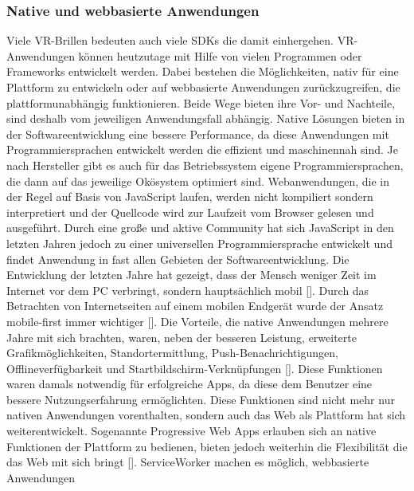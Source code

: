 \documentclass[a4paper,12pt,oneside]{article}
\begin{document}
      \subsubsection{Native und webbasierte Anwendungen}
        Viele VR-Brillen bedeuten auch viele SDKs die damit einhergehen. VR-Anwendungen
        können heutzutage mit Hilfe von vielen Programmen oder Frameworks entwickelt
        werden. Dabei bestehen die Möglichkeiten, nativ für eine Plattform zu entwickeln oder 
        auf webbasierte Anwendungen zurückzugreifen, die plattformunabhängig funktionieren. 
        Beide Wege bieten ihre Vor- und Nachteile, sind deshalb vom jeweiligen Anwendungsfall abhängig.
        Native Lösungen bieten in der Softwareentwicklung eine bessere 
        Performance, da diese Anwendungen mit Programmiersprachen entwickelt werden die
        effizient und maschinennah sind. Je nach Hersteller gibt es auch für das 
        Betriebssystem eigene Programmiersprachen, die dann auf das jeweilige Okösystem 
        optimiert sind.
        Webanwendungen, die in der Regel auf Basis von JavaScript laufen, werden nicht 
        kompiliert sondern interpretiert und der Quellcode wird zur Laufzeit vom Browser 
        gelesen und ausgeführt.
        Durch eine große und aktive Community hat sich JavaScript in den letzten Jahren 
        jedoch zu einer universellen Programmiersprache entwickelt und findet Anwendung in
        fast allen Gebieten der Softwareentwicklung.
        Die Entwicklung der letzten Jahre hat gezeigt, dass der Mensch weniger
        Zeit im Internet vor dem PC verbringt, sondern hauptsächlich mobil [\cite[1]{Ater2017}].
        Durch das Betrachten von Internetseiten auf einem mobilen Endgerät wurde der
        Ansatz mobile-first immer wichtiger [\cite[1]{Ater2017}]. Die Vorteile, die native
        Anwendungen mehrere Jahre mit sich brachten, waren, neben der besseren Leistung,
        erweiterte Grafikmöglichkeiten, Standortermittlung, Push-Benachrichtigungen,
        Offlineverfügbarkeit und Startbildschirm-Verknüpfungen [\cite[3]{Ater2017}]. Diese
        Funktionen waren damals notwendig für erfolgreiche Apps, da diese dem
        Benutzer eine bessere Nutzungserfahrung ermöglichten. Diese Funktionen sind nicht mehr
        nur nativen Anwendungen vorenthalten, sondern auch das Web als Plattform hat sich
        weiterentwickelt.
        Sogenannte Progressive Web Apps erlauben sich an native Funktionen der Plattform zu
        bedienen, bieten jedoch weiterhin die Flexibilität die das Web mit sich bringt
        [\cite[2]{Ater2017}].
        ServiceWorker machen es möglich, webbasierte Anwendungen 
\end{document}
